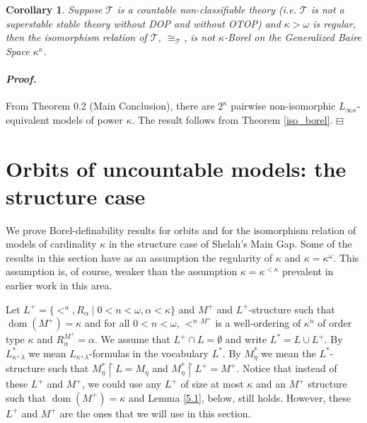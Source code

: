 \documentclass[12pt,a4paper]{amsart}
\newtheorem{cor}[thm]{Corollary}
\theoremstyle{definition}
\theoremstyle{remark}
\DeclareMathOperator{\dom}{dom}
\renewcommand{\mid}{\mathrel{|}\allowbreak}
\renewcommand{\restriction}{\mathbin\upharpoonright}
\newenvironment{cproof}{\paragraph{\emph{Proof.\,}}}{\hfill{$\boxminus$}\par\vspace{2mm}}
\begin{document}
\begin{cor}
    Suppose $\mathcal{T}$ is a countable non-classifiable theory (i.e. $\mathcal{T}$ is not a superstable stable theory without DOP and without OTOP) and $\kappa>\omega$ is regular, then the isomorphism relation of $\mathcal{T}$, $\cong_\mathcal{T}$, is not $\kappa$-Borel on the Generalized Baire Space $\kappa^\kappa$.
\end{cor}

\begin{cproof}
    From \cite{MR899084} Theorem 0.2 (Main Conclusion), there are $2^\kappa$ pairwise non-isomorphic $L_{\infty \kappa}$-equivalent models of power $\kappa$. The result follows from Theorem \ref{iso_borel}.
\end{cproof}

\section{Orbits of uncountable models: the structure case}

We prove Borel-definability results for orbits and for the isomorphism relation of models of cardinality $\kappa$  in the structure case of Shelah's Main Gap. 
Some of the results in this section have as an assumption the regularity of $\kappa$ and $\kappa=\kappa^\omega$. This assumption is, of course, weaker than the assumption $\kappa=\kappa^{<\kappa}$ prevalent in earlier work in this area.

Let $L^+=\{<^n, R_\alpha\mid 0<n<\omega, \alpha<\kappa\}$ and $M^+$ and $L^+$-structure such that $\dom (M^+)=\kappa$ and for all $0<n<\omega$, $<^n {}^{M^+}$ is a well-ordering of $\kappa^n$ of order type $\kappa$ and $R_\alpha^{M^+}=\alpha$. We assume that $L^+\cap L=\emptyset$ and write $L^*=L\cup L^+$. By $L^*_{\kappa^+\lambda}$ we mean $L_{\kappa^+\lambda}$-formulas in the vocabulary $L^*$. By $M_\eta^*$ we mean the $L^*$-structure such that $M_\eta^*\restriction L=M_\eta$ and $M_\eta^*\restriction L^+=M^+$. Notice that instead of these $L^+$ and $M^+$, we could use any $L^+$ of size at most $\kappa$ and an $M^+$ structure such that $\dom (M^+)=\kappa$ and Lemma \ref{5.1}, below, still holds. However, these $L^+$ and $M^+$ are the ones that we will use in this section.
\end{document}
